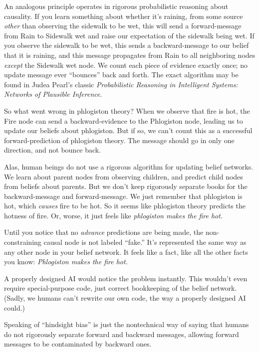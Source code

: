 {
 An analogous principle operates in rigorous probabilistic
reasoning about causality. If you learn something about whether
it's raining, from some source \textit{other} than
observing the sidewalk to be wet, this will send a forward-message from
Rain to Sidewalk wet and raise our expectation of the sidewalk being
wet. If you observe the sidewalk to be wet, this sends a
backward-message to our belief that it is raining, and this message
propagates from Rain to all neighboring nodes \textit{except} the
Sidewalk wet node. We count each piece of evidence exactly once; no
update message ever ``bounces'' back
and forth. The exact algorithm may be found in Judea
Pearl's classic \textit{Probabilistic Reasoning in
Intelligent Systems: Networks of Plausible Inference}.}

{
 So what went wrong in phlogiston theory? When we observe that fire
is hot, the Fire node can send a backward-evidence to the Phlogiston
node, leading us to update our beliefs about phlogiston. But if so, we
can't count this as a successful forward-prediction of
phlogiston theory. The message should go in only one direction, and not
bounce back.}

{
 Alas, human beings do not use a rigorous algorithm for updating
belief networks. We learn about parent nodes from observing children,
and predict child nodes from beliefs about parents. But we
don't keep rigorously separate books for the
backward-message and forward-message. We just remember that phlogiston
is hot, which \textit{causes} fire to be hot. So it seems like
phlogiston theory predicts the hotness of fire. Or, worse, it just
feels like \textit{phlogiston makes the fire hot.}}

{
 Until you notice that no \textit{advance} predictions are being
made, the non-constraining causal node is not labeled
``fake.'' It's
represented the same way as any other node in your belief network. It
feels like a fact, like all the other facts you know:
\textit{Phlogiston makes the fire hot.}}

{
 A properly designed AI would notice the problem instantly. This
wouldn't even require special-purpose code, just
correct bookkeeping of the belief network. (Sadly, we humans
can't rewrite our own code, the way a properly designed
AI could.)}

{
 Speaking of ``hindsight bias''
is just the nontechnical way of saying that humans do not rigorously
separate forward and backward messages, allowing forward messages to be
contaminated by backward ones.}


